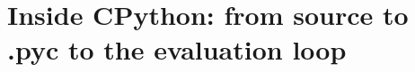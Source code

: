 \chapter{Inside CPython: from source to .pyc to the evaluation loop}
\label{ch:inside-cpython-from-source-to-pyc-to}

